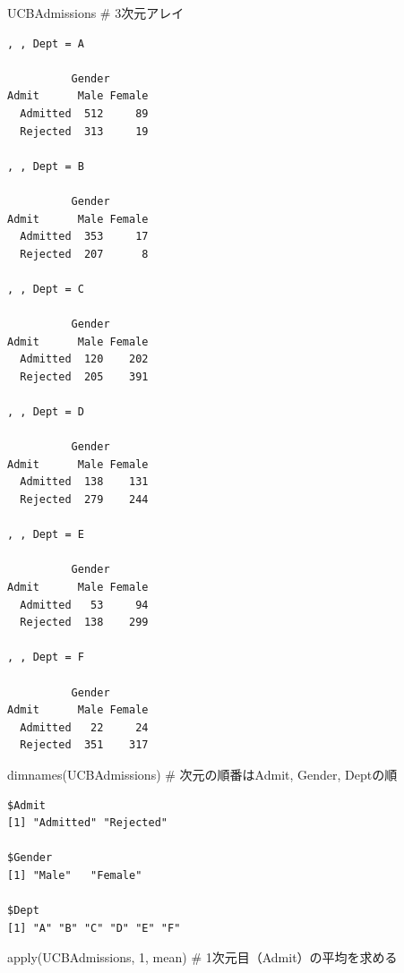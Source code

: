 \documentclass[
  letterpaper,
  DIV=11,
  numbers=noendperiod]{scrreprt}
\newenvironment{Shaded}{\begin{snugshade}}{\end{snugshade}}
\newcommand{\CommentTok}[1]{\textcolor[rgb]{0.37,0.37,0.37}{#1}}
\newcommand{\DecValTok}[1]{\textcolor[rgb]{0.68,0.00,0.00}{#1}}
\newcommand{\FunctionTok}[1]{\textcolor[rgb]{0.28,0.35,0.67}{#1}}
\newcommand{\NormalTok}[1]{\textcolor[rgb]{0.00,0.23,0.31}{#1}}
\begin{document}
\begin{Shaded}
\begin{Highlighting}[]
\NormalTok{UCBAdmissions }\CommentTok{\# 3次元アレイ}
\end{Highlighting}
\end{Shaded}

\begin{verbatim}
, , Dept = A

          Gender
Admit      Male Female
  Admitted  512     89
  Rejected  313     19

, , Dept = B

          Gender
Admit      Male Female
  Admitted  353     17
  Rejected  207      8

, , Dept = C

          Gender
Admit      Male Female
  Admitted  120    202
  Rejected  205    391

, , Dept = D

          Gender
Admit      Male Female
  Admitted  138    131
  Rejected  279    244

, , Dept = E

          Gender
Admit      Male Female
  Admitted   53     94
  Rejected  138    299

, , Dept = F

          Gender
Admit      Male Female
  Admitted   22     24
  Rejected  351    317
\end{verbatim}

\begin{Shaded}
\begin{Highlighting}[]
\FunctionTok{dimnames}\NormalTok{(UCBAdmissions) }\CommentTok{\# 次元の順番はAdmit, Gender, Deptの順}
\end{Highlighting}
\end{Shaded}

\begin{verbatim}
$Admit
[1] "Admitted" "Rejected"

$Gender
[1] "Male"   "Female"

$Dept
[1] "A" "B" "C" "D" "E" "F"
\end{verbatim}

\begin{Shaded}
\begin{Highlighting}[]
\FunctionTok{apply}\NormalTok{(UCBAdmissions, }\DecValTok{1}\NormalTok{, mean) }\CommentTok{\# 1次元目（Admit）の平均を求める}
\end{Highlighting}
\end{Shaded}
\end{document}
